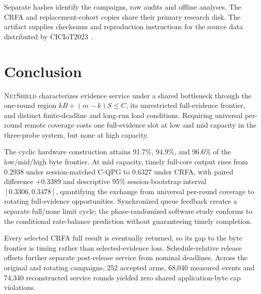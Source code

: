 \documentclass[10pt,journal]{IEEEtran}
\newcommand{\NetShield}{\textsc{NetShield}}
\newcommand{\CRFA}{\textsc{CRFA}}
\begin{document}
Separate hashes identify the campaigns, raw audits and offline analyses.
The \CRFA{} and replacement-cohort copies share their primary research disk.
The artifact supplies checksums and reproduction instructions for the source
data distributed by CICIoT2023~\cite{neto2023ciciot}.

\section{Conclusion}
\label{sec:conclusion}

\NetShield{} characterizes evidence service under a shared bottleneck through
the one-round region $kB+(m-k)S\leq C$, its unrestricted full-evidence
frontier, and distinct finite-deadline and long-run load conditions. Requiring
universal per-round remote coverage costs one full-evidence slot at low and
mid capacity in the three-probe system, but none at high capacity.

The cyclic hardware construction attains 91.7\%, 94.9\%, and 96.6\% of the
low/mid/high byte frontier. At mid capacity, timely full-core output rises
from 0.2938 under session-matched C-QPG to 0.6327 under \CRFA{}, with paired
difference $+0.3389$ and descriptive 95\% session-bootstrap interval
$[0.3306,0.3478]$, quantifying the exchange from universal per-round
coverage to rotating full-evidence opportunities. Synchronized queue
feedback creates a separate
full/none limit cycle; the phase-randomized software study conforms to the
conditional rate-balance prediction without guaranteeing timely completion.

Every selected \CRFA{} full result is eventually returned, so its gap to the
byte frontier is timing rather than selected-evidence loss. Schedule-relative
release offsets further separate post-release service from nominal deadlines.
Across the original and rotating campaigns, 252 accepted arms, 68,040 measured events and 74,340
reconstructed service rounds yielded zero shared application-byte cap violations.
\end{document}
